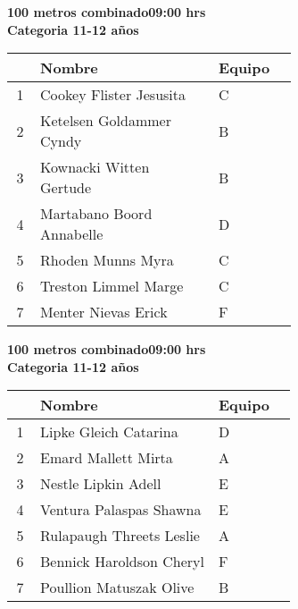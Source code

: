 \begin{minipage}{0.95\linewidth}\vspace{0.5cm} 
\begin{flushleft}
\textbf{
\hspace{-0.15cm}100 metros combinado\hspace{1.5cm}09:00 hrs \\Categoria 11-12 años}\vspace{-0.2cm} 
\end{flushleft}
\begin{tabular}{cp{0.63\linewidth}l}
\hline
& \textbf{Nombre} & \textbf{Equipo} \\ \hline
1 & Cookey Flister Jesusita & C \\ 
2 & Ketelsen Goldammer Cyndy & B \\ 
3 & Kownacki Witten Gertude & B \\ 
4 & Martabano Boord Annabelle & D \\ 
5 & Rhoden Munns Myra & C \\ 
6 & Treston Limmel Marge & C \\ 
7 & Menter Nievas Erick & F \\ 
\end{tabular}
\end{minipage}
\begin{minipage}{0.95\linewidth}\vspace{0.5cm} 
\begin{flushleft}
\textbf{
\hspace{-0.15cm}100 metros combinado\hspace{1.5cm}09:00 hrs \\Categoria 11-12 años}\vspace{-0.2cm} 
\end{flushleft}
\begin{tabular}{cp{0.63\linewidth}l}
\hline
& \textbf{Nombre} & \textbf{Equipo} \\ \hline
1 & Lipke Gleich Catarina & D \\ 
2 & Emard Mallett Mirta & A \\ 
3 & Nestle Lipkin Adell & E \\ 
4 & Ventura Palaspas Shawna & E \\ 
5 & Rulapaugh Threets Leslie & A \\ 
6 & Bennick Haroldson Cheryl & F \\ 
7 & Poullion Matuszak Olive & B \\ 
\end{tabular}
\end{minipage}
